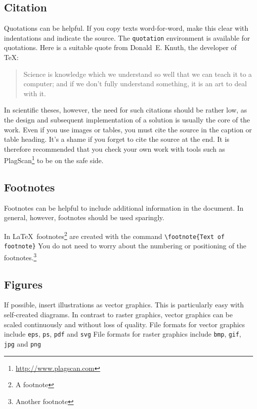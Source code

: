 \documentclass{llncs}
\begin{document}
\subsection{Citation}

Quotations can be helpful. If you copy texts word-for-word, make this clear with indentations and indicate the source. The \texttt{quotation} environment is available for quotations. Here is a suitable quote from Donald~E. Knuth, the developer of \TeX:

\begin{quotation}
  Science is knowledge which we understand so well that we can teach it to a computer; and if we don't fully understand something, it is an art to deal with it.~\cite{Knuth1974}
\end{quotation}


In scientific theses, however, the need for such citations should be rather low, as the design and subsequent implementation of a solution is usually the core of the work. Even if you use images or tables, you must cite the source in the caption or table heading. It's a shame if you forget to cite the source at the end. It is therefore recommended that you check your own work with tools such as PlagScan\footnote{\url{http://www.plagscan.com}} to be on the safe side.

\subsection{Footnotes}

Footnotes can be helpful to include additional information in the document. In general, however, footnotes should be used sparingly.

In \LaTeX\, footnotes\footnote{A footnote} are created with the command \verb!\footnote{Text of footnote}! You do not need to worry about the numbering or positioning of the footnotes.\footnote{Another footnote}

\subsection{Figures}

If possible, insert illustrations as vector graphics. This is particularly easy with self-created diagrams. In contrast to raster graphics, vector graphics can be scaled continuously and without loss of quality. File formats for vector graphics include \verb!eps!, \verb!ps!, \verb!pdf! and \verb!svg! File formats for raster graphics include \verb!bmp!, \verb!gif!, \verb!jpg! and \verb!png!
\end{document}

